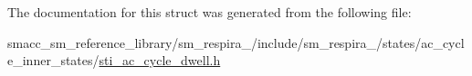 The documentation for this struct was generated from the following file\+:\begin{DoxyCompactItemize}
\item 
smacc\+\_\+sm\+\_\+reference\+\_\+library/sm\+\_\+respira\+\_/include/sm\+\_\+respira\+\_/states/ac\+\_\+cycle\+\_\+inner\+\_\+states/\hyperlink{sti__ac__cycle__dwell_8h}{sti\+\_\+ac\+\_\+cycle\+\_\+dwell.\+h}\end{DoxyCompactItemize}
